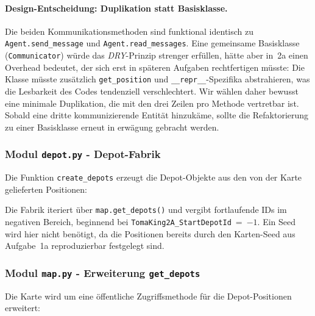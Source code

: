 \paragraph{Design-Entscheidung: Duplikation statt Basisklasse.} Die beiden Kommunikationsmethoden sind funktional identisch zu \texttt{Agent.send\_message} und \texttt{Agent.read\_messages}. Eine gemeinsame Basisklasse (\texttt{Communicator}) würde das \textit{DRY}-Prinzip strenger erfüllen, hätte aber in~2a einen Overhead bedeutet, der sich erst in späteren Aufgaben rechtfertigen müsste: Die Klasse müsste zusätzlich \texttt{get\_position} und \texttt{\_\_repr\_\_}-Spezifika abstrahieren, was die Lesbarkeit des Codes tendenziell verschlechtert. Wir wählen daher bewusst eine minimale Duplikation, die mit den drei Zeilen pro Methode vertretbar ist. Sobald eine dritte kommunizierende Entität hinzukäme, sollte die Refaktorierung zu einer Basisklasse erneut in erwägung gebracht werden.


\subsubsection{Modul \texttt{depot.py} - Depot-Fabrik}

Die Funktion \texttt{create\_depots} erzeugt die Depot-Objekte aus den von der Karte gelieferten Positionen:



Die Fabrik iteriert über \texttt{map.get\_depots()} und vergibt fortlaufende IDs im negativen Bereich, beginnend bei \texttt{TomaKing2A\_StartDepotId}~=~\(-1\). Ein Seed wird hier nicht benötigt, da die Positionen bereits durch den Karten-Seed aus Aufgabe~1a reproduzierbar festgelegt sind.


\subsubsection{Modul \texttt{map.py} - Erweiterung \texttt{get\_depots}}

Die Karte wird um eine öffentliche Zugriffsmethode für die Depot-Positionen erweitert:



